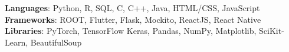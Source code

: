    \begin{itemize}[leftmargin=0.15in, label={}] 
    \small{\item{
      \textbf{Languages}: Python, R, SQL, C, C++, Java, HTML/CSS, JavaScript\\
      \textbf{Frameworks}: ROOT, Flutter, Flask, Mockito, ReactJS, React Native\\
      \textbf{Libraries}: PyTorch, TensorFlow Keras, Pandas, NumPy, Matplotlib, SciKit-Learn, BeautifulSoup
       }}
\end{itemize}